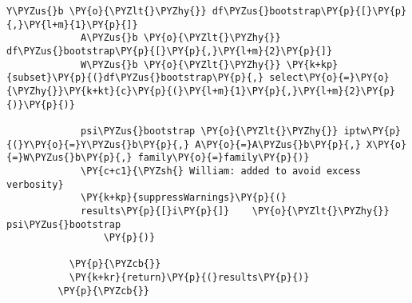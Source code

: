 \begin{Verbatim}[commandchars=\\\{\}]
             Y\PYZus{}b \PY{o}{\PYZlt{}\PYZhy{}} df\PYZus{}bootstrap\PY{p}{[}\PY{p}{,}\PY{l+m}{1}\PY{p}{]}
             A\PYZus{}b \PY{o}{\PYZlt{}\PYZhy{}} df\PYZus{}bootstrap\PY{p}{[}\PY{p}{,}\PY{l+m}{2}\PY{p}{]}
             W\PYZus{}b \PY{o}{\PYZlt{}\PYZhy{}} \PY{k+kp}{subset}\PY{p}{(}df\PYZus{}bootstrap\PY{p}{,} select\PY{o}{=}\PY{o}{\PYZhy{}}\PY{k+kt}{c}\PY{p}{(}\PY{l+m}{1}\PY{p}{,}\PY{l+m}{2}\PY{p}{)}\PY{p}{)}
         
             psi\PYZus{}bootstrap \PY{o}{\PYZlt{}\PYZhy{}} iptw\PY{p}{(}Y\PY{o}{=}Y\PYZus{}b\PY{p}{,} A\PY{o}{=}A\PYZus{}b\PY{p}{,} X\PY{o}{=}W\PYZus{}b\PY{p}{,} family\PY{o}{=}family\PY{p}{)}
             \PY{c+c1}{\PYZsh{} William: added to avoid excess verbosity}
             \PY{k+kp}{suppressWarnings}\PY{p}{(}
             results\PY{p}{[}i\PY{p}{]}    \PY{o}{\PYZlt{}\PYZhy{}} psi\PYZus{}bootstrap
                 \PY{p}{)}
               
           \PY{p}{\PYZcb{}}
           \PY{k+kr}{return}\PY{p}{(}results\PY{p}{)}
         \PY{p}{\PYZcb{}}
\end{Verbatim}

